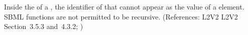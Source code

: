 Inside the  of a \FunctionDefinition, the identifier of that
\FunctionDefinition cannot appear as the value of a  element.
SBML functions are not permitted to be recursive.  (References: L2V2
L2V2 Section~3.5.3 and~4.3.2; )
